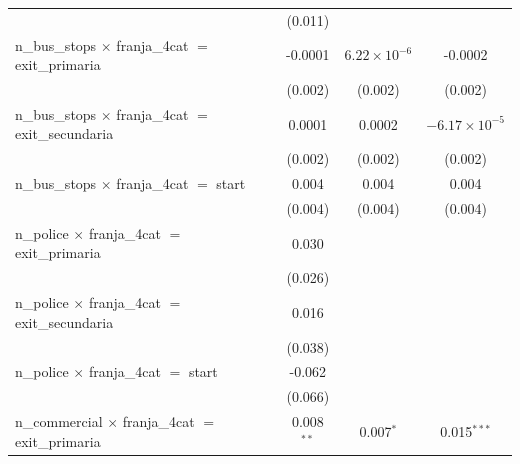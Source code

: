 \begin{tabular}{lccc}
                                                                                               & (0.011)        &                       &   \\   
   n\_bus\_stops $\times$ franja\_4cat $=$ exit\_primaria                                      & -0.0001        & $6.22\times 10^{-6}$  & -0.0002\\   
                                                                                               & (0.002)        & (0.002)               & (0.002)\\   
   n\_bus\_stops $\times$ franja\_4cat $=$ exit\_secundaria                                    & 0.0001         & 0.0002                & $-6.17\times 10^{-5}$\\    
                                                                                               & (0.002)        & (0.002)               & (0.002)\\   
   n\_bus\_stops $\times$ franja\_4cat $=$ start                                               & 0.004          & 0.004                 & 0.004\\   
                                                                                               & (0.004)        & (0.004)               & (0.004)\\   
   n\_police $\times$ franja\_4cat $=$ exit\_primaria                                          & 0.030          &                       &   \\   
                                                                                               & (0.026)        &                       &   \\   
   n\_police $\times$ franja\_4cat $=$ exit\_secundaria                                        & 0.016          &                       &   \\   
                                                                                               & (0.038)        &                       &   \\   
   n\_police $\times$ franja\_4cat $=$ start                                                   & -0.062         &                       &   \\   
                                                                                               & (0.066)        &                       &   \\   
   n\_commercial $\times$ franja\_4cat $=$ exit\_primaria                                      & 0.008$^{**}$   & 0.007$^{*}$           & 0.015$^{***}$\\   

\end{tabular}
